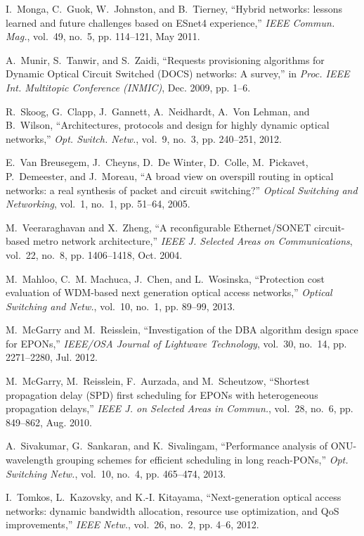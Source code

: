 \documentclass[article]{IEEEtran}
\begin{document}
\begin{thebibliography}{100}
I.~Monga, C.~Guok, W.~Johnston, and B.~Tierney, ``Hybrid networks: lessons
  learned and future challenges based on {ESnet4} experience,'' \emph{IEEE
  Commun. Mag.}, vol.~49, no.~5, pp. 114--121, May 2011.

A.~Munir, S.~Tanwir, and S.~Zaidi, ``Requests provisioning algorithms for
  {Dynamic Optical Circuit Switched (DOCS)} networks: A survey,'' in
  \emph{Proc. IEEE Int. Multitopic Conference (INMIC)}, Dec. 2009, pp. 1--6.

R.~Skoog, G.~Clapp, J.~Gannett, A.~Neidhardt, A.~{Von Lehman}, and B.~Wilson,
  ``Architectures, protocols and design for highly dynamic optical networks,''
  \emph{Opt. Switch. Netw.}, vol.~9, no.~3, pp. 240--251, 2012.

E.~{Van Breusegem}, J.~Cheyns, D.~{De Winter}, D.~Colle, M.~Pickavet,
  P.~Demeester, and J.~Moreau, ``A broad view on overspill routing in optical
  networks: a real synthesis of packet and circuit switching?'' \emph{Optical
  Switching and Networking}, vol.~1, no.~1, pp. 51--64, 2005.

M.~Veeraraghavan and X.~Zheng, ``A reconfigurable {Ethernet/SONET}
  circuit-based metro network architecture,'' \emph{IEEE J. Selected Areas on
  Communications}, vol.~22, no.~8, pp. 1406--1418, Oct. 2004.

M.~Mahloo, C.~M. Machuca, J.~Chen, and L.~Wosinska, ``Protection cost
  evaluation of {WDM}-based next generation optical access networks,''
  \emph{Optical Switching and Netw.}, vol.~10, no.~1, pp. 89--99, 2013.

M.~McGarry and M.~Reisslein, ``Investigation of the {DBA} algorithm design
  space for {EPONs},'' \emph{IEEE/OSA Journal of Lightwave Technology},
  vol.~30, no.~14, pp. 2271--2280, Jul. 2012.

M.~McGarry, M.~Reisslein, F.~Aurzada, and M.~Scheutzow, ``Shortest propagation
  delay {(SPD)} first scheduling for {EPONs} with heterogeneous propagation
  delays,'' \emph{IEEE J. on Selected Areas in Commun.}, vol.~28, no.~6, pp.
  849--862, Aug. 2010.

A.~Sivakumar, G.~Sankaran, and K.~Sivalingam, ``Performance analysis of
  {ONU}-wavelength grouping schemes for efficient scheduling in long
  reach-{PONs},'' \emph{Opt. Switching Netw.}, vol.~10, no.~4, pp. 465--474,
  2013.

I.~Tomkos, L.~Kazovsky, and K.-I. Kitayama, ``Next-generation optical access
  networks: dynamic bandwidth allocation, resource use optimization, and {QoS}
  improvements,'' \emph{IEEE Netw.}, vol.~26, no.~2, pp. 4--6, 2012.


\end{thebibliography}
\end{document}
